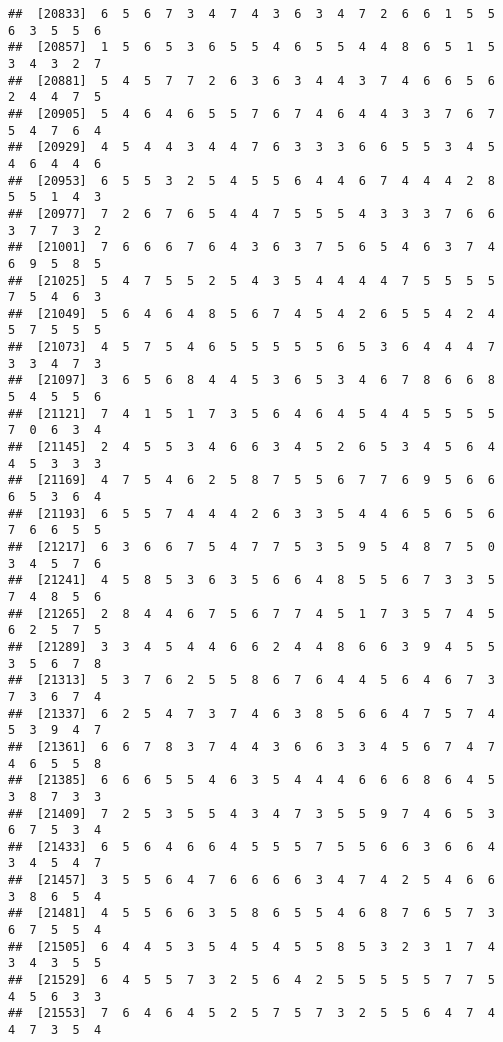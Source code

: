\documentclass[
]{book}
\begin{document}
\begin{verbatim}
##  [20833]  6  5  6  7  3  4  7  4  3  6  3  4  7  2  6  6  1  5  5  6  3  5  5  6
##  [20857]  1  5  6  5  3  6  5  5  4  6  5  5  4  4  8  6  5  1  5  3  4  3  2  7
##  [20881]  5  4  5  7  7  2  6  3  6  3  4  4  3  7  4  6  6  5  6  2  4  4  7  5
##  [20905]  5  4  6  4  6  5  5  7  6  7  4  6  4  4  3  3  7  6  7  5  4  7  6  4
##  [20929]  4  5  4  4  3  4  4  7  6  3  3  3  6  6  5  5  3  4  5  4  6  4  4  6
##  [20953]  6  5  5  3  2  5  4  5  5  6  4  4  6  7  4  4  4  2  8  5  5  1  4  3
##  [20977]  7  2  6  7  6  5  4  4  7  5  5  5  4  3  3  3  7  6  6  3  7  7  3  2
##  [21001]  7  6  6  6  7  6  4  3  6  3  7  5  6  5  4  6  3  7  4  6  9  5  8  5
##  [21025]  5  4  7  5  5  2  5  4  3  5  4  4  4  4  7  5  5  5  5  7  5  4  6  3
##  [21049]  5  6  4  6  4  8  5  6  7  4  5  4  2  6  5  5  4  2  4  5  7  5  5  5
##  [21073]  4  5  7  5  4  6  5  5  5  5  5  6  5  3  6  4  4  4  7  3  3  4  7  3
##  [21097]  3  6  5  6  8  4  4  5  3  6  5  3  4  6  7  8  6  6  8  5  4  5  5  6
##  [21121]  7  4  1  5  1  7  3  5  6  4  6  4  5  4  4  5  5  5  5  7  0  6  3  4
##  [21145]  2  4  5  5  3  4  6  6  3  4  5  2  6  5  3  4  5  6  4  4  5  3  3  3
##  [21169]  4  7  5  4  6  2  5  8  7  5  5  6  7  7  6  9  5  6  6  6  5  3  6  4
##  [21193]  6  5  5  7  4  4  4  2  6  3  3  5  4  4  6  5  6  5  6  7  6  6  5  5
##  [21217]  6  3  6  6  7  5  4  7  7  5  3  5  9  5  4  8  7  5  0  3  4  5  7  6
##  [21241]  4  5  8  5  3  6  3  5  6  6  4  8  5  5  6  7  3  3  5  7  4  8  5  6
##  [21265]  2  8  4  4  6  7  5  6  7  7  4  5  1  7  3  5  7  4  5  6  2  5  7  5
##  [21289]  3  3  4  5  4  4  6  6  2  4  4  8  6  6  3  9  4  5  5  3  5  6  7  8
##  [21313]  5  3  7  6  2  5  5  8  6  7  6  4  4  5  6  4  6  7  3  7  3  6  7  4
##  [21337]  6  2  5  4  7  3  7  4  6  3  8  5  6  6  4  7  5  7  4  5  3  9  4  7
##  [21361]  6  6  7  8  3  7  4  4  3  6  6  3  3  4  5  6  7  4  7  4  6  5  5  8
##  [21385]  6  6  6  5  5  4  6  3  5  4  4  4  6  6  6  8  6  4  5  3  8  7  3  3
##  [21409]  7  2  5  3  5  5  4  3  4  7  3  5  5  9  7  4  6  5  3  6  7  5  3  4
##  [21433]  6  5  6  4  6  6  4  5  5  5  7  5  5  6  6  3  6  6  4  3  4  5  4  7
##  [21457]  3  5  5  6  4  7  6  6  6  6  3  4  7  4  2  5  4  6  6  3  8  6  5  4
##  [21481]  4  5  5  6  6  3  5  8  6  5  5  4  6  8  7  6  5  7  3  6  7  5  5  4
##  [21505]  6  4  4  5  3  5  4  5  4  5  5  8  5  3  2  3  1  7  4  3  4  3  5  5
##  [21529]  6  4  5  5  7  3  2  5  6  4  2  5  5  5  5  5  7  7  5  4  5  6  3  3
##  [21553]  7  6  4  6  4  5  2  5  7  5  7  3  2  5  5  6  4  7  4  4  7  3  5  4

\end{verbatim}
\end{document}
